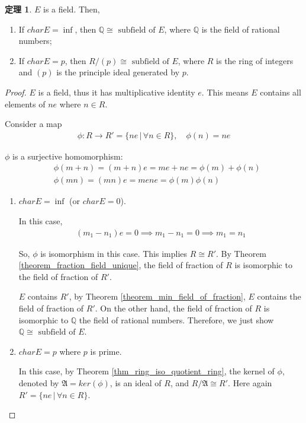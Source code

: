 \documentclass[utf8]{ctexbook}
\theoremstyle{definition}
\newtheorem{prototheorem}{定理}[section]
\newenvironment{theorem}
   {\colorlet{shadecolor}{pink!30}\begin{shaded}\begin{prototheorem}}
   {\end{prototheorem}\end{shaded}}
\begin{document}
\begin{theorem}\label{thm_4_1_field_extension_iso}
$E$ is a field. Then,
\begin{enumerate}
\item{If $char E = \inf$, then $\mathbb{Q} \cong \mbox{ subfield of } E$, where $\mathbb{Q}$ is the field of rational numbers;}
\item{If $char E = p$, then $R/(p) \cong \mbox{ subfield of } E$, where $R$ is the ring of integers and $(p)$ is the principle ideal generated by $p$.}
\end{enumerate}
\end{theorem}

\begin{proof}
$E$ is a field, thus it has multiplicative identity $e$. This means $E$ contains all elements of $ne$ where $n \in R$.

Consider a map
\begin{align*}
\phi : R \longrightarrow R' = \{ ne \, | \, \forall n \in R \} , \quad  \phi(n) = ne
\end{align*} 

$\phi$ is a surjective homomorphism:
\begin{align*}
& \phi(m+n) = (m+n)e = me + ne = \phi(m) + \phi(n) \\
& \phi(mn) = (mn)e = me ne = \phi(m) \phi(n)
\end{align*}

\begin{enumerate}
\item{$char E = \inf $ (or $char E = 0$).

In this case,
\begin{align*}
(m_1 - n_1 ) e = 0 \implies m_1 - n_1 = 0 \implies m_1 = n_1
\end{align*}

So, $\phi$ is isomorphism in this case. This implies $R \cong R'$. By Theorem \ref{theorem_fraction_field_unique}, the field of fraction of $R$ is isomorphic to the field of fraction of $R'$. 

$E$ contains $R'$, by Theorem \ref{theorem_min_field_of_fraction}, $E$ contains the field of fraction of $R'$. On the other hand, the field of fraction of $R$ is isomorphic to $\mathbb{Q}$ the field of rational numbers. Therefore, we just show $\mathbb{Q} \cong \mbox{ subfield of } E$.
}
\item{$char E = p$ where $p$ is prime.

In this case, by Theorem \ref{thm_ring_iso_quotient_ring}, the kernel of $\phi$, denoted by $\mathfrak{A} = ker (\phi)$, is an ideal of $R$, and $R / \mathfrak{A} \cong R'$. Here again $R' = \{ ne\, | \, \forall n \in R \}$. 

}
\end{enumerate}
\end{proof}
\end{document}
